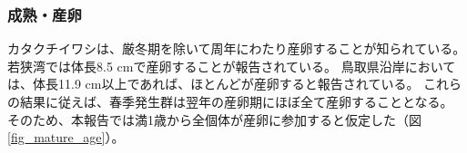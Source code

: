 \subsubsection{成熟・産卵}
カタクチイワシは、厳冬期を除いて周年にわたり産卵することが知られている。
若狭湾では体長8.5 cmで産卵することが報告されている\citep{Funamoto2004}。
鳥取県沿岸においては、体長11.9 cm以上であれば、ほとんどが産卵すると報告されている\citep{Shimura2008}。
これらの結果に従えば、春季発生群は翌年の産卵期にほぼ全て産卵することとなる。
そのため、本報告では満1歳から全個体が産卵に参加すると仮定した（図\ref{fig_mature_age}）。
